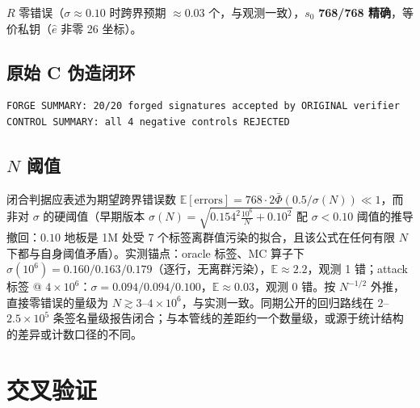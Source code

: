 \documentclass[11pt,a4paper]{ctexart}
\begin{document}
$R$ 零错误（$\sigma\approx0.10$ 时跨界预期 $\approx0.03$ 个，与观测一致），$s_0$ \textbf{768/768 精确}，等价私钥（$\hat e$ 非零 26 坐标）。

\subsection{原始 C 伪造闭环}

\begin{verbatim}
FORGE SUMMARY: 20/20 forged signatures accepted by ORIGINAL verifier
CONTROL SUMMARY: all 4 negative controls REJECTED
\end{verbatim}

\subsection{$N$ 阈值}

闭合判据应表述为期望跨界错误数 $\mathbb{E}[\text{errors}] = 768\cdot 2\bar\Phi(0.5/\sigma(N))\ll1$，而非对 $\sigma$ 的硬阈值（早期版本 $\sigma(N) = \sqrt{0.154^2\frac{10^6}{N}+0.10^2}$ 配 $\sigma<0.10$ 阈值的推导撤回：$0.10$ 地板是 1M 处受 7 个标签离群值污染的拟合，且该公式在任何有限 $N$ 下都与自身阈值矛盾）。实测锚点：oracle 标签、MC 算子下 $\sigma(10^6) = 0.160/0.163/0.179$（逐行，无离群污染），$\mathbb{E}\approx2.2$，观测 1 错；attack 标签 @ $4\times10^6$：$\sigma = 0.094/0.094/0.100$，$\mathbb{E}\approx0.03$，观测 0 错。按 $N^{-1/2}$ 外推，直接零错误的量级为 $N\gtrsim3$--$4\times10^6$，与实测一致。同期公开的回归路线在 $2$--$2.5\times10^5$ 条签名量级报告闭合；与本管线的差距约一个数量级，或源于统计结构的差异或计数口径的不同。

\section{交叉验证}\label{sec:crossval}
\end{document}
